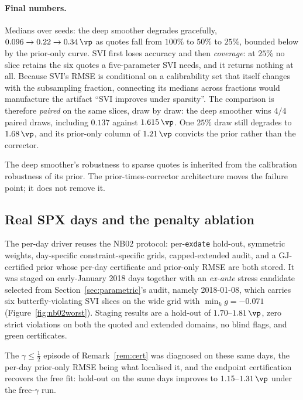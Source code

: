 \paragraph{Final numbers.} Medians over seeds: the deep smoother degrades gracefully,
$0.096\to0.22\to0.34\,\vp$ as quotes fall from $100\%$ to $50\%$ to $25\%$, bounded below by
the prior-only curve. SVI first loses accuracy and then \emph{coverage}: at $25\%$ no slice
retains the six quotes a five-parameter SVI needs, and it returns nothing at all. Because
SVI's RMSE is conditional on a calibrability set that itself changes with the subsampling
fraction, connecting its medians across fractions would manufacture the artifact ``SVI
improves under sparsity''. The comparison is therefore \emph{paired} on the same slices, draw
by draw: the deep smoother wins $4/4$ paired draws, including $0.137$ against $1.615\,\vp$.
One $25\%$ draw still degrades to $1.68\,\vp$, and its prior-only column of $1.21\,\vp$
convicts the prior rather than the corrector.

\begin{finding}\label{find:sparsity}
The deep smoother's robustness to sparse quotes is inherited from the calibration robustness
of its prior. The prior-times-corrector architecture moves the failure point; it does not
remove it.
\end{finding}

\subsection{Real SPX days and the penalty ablation}\label{sec:realablation}

The per-day driver reuses the NB02 protocol: per-\texttt{exdate} hold-out, symmetric weights,
day-specific constraint-specific grids, capped-extended audit, and a GJ-certified prior whose
per-day certificate and prior-only RMSE are both stored. It was staged on early-January 2018
days together with an \emph{ex-ante} stress candidate selected from
Section~\ref{sec:parametric}'s audit, namely 2018-01-08, which carries six butterfly-violating
SVI slices on the wide grid with $\min_k g=-0.071$ (Figure~\ref{fig:nb02worst}). Staging
results are a hold-out of $1.70$--$1.81\,\vp$, zero strict violations on both the quoted and
extended domains, no blind flags, and green certificates.

The $\gamma\le\tfrac12$ episode of Remark~\ref{rem:cert} was diagnosed on these same days, the
per-day prior-only RMSE being what localised it, and the endpoint certification recovers the
free fit: hold-out on the same days improves to $1.15$--$1.31\,\vp$ under the free-$\gamma$
run.

